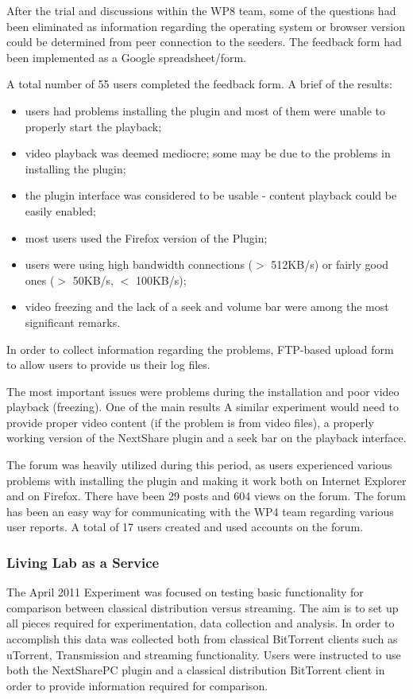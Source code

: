 After the trial and discussions within the WP8 team, some of the questions had
been eliminated as information regarding the operating system or browser
version could be determined from peer connection to the seeders. The feedback
form had been implemented as a Google spreadsheet/form.

A total number of 55 users completed the feedback form. A brief of the
results:
\begin{itemize}
  \item users had problems installing the plugin and most of them were
  unable to properly start the playback;
  \item video playback was deemed mediocre; some may
  be due to the problems in installing the plugin;
  \item the plugin interface was considered to be usable - content playback
  could be easily enabled;
  \item most users used the Firefox version of the Plugin;
  \item users were using high bandwidth connections ($>$ 512KB/s) or fairly
  good ones ($>$ 50KB/s, $<$ 100KB/s);
  \item video freezing and the lack of a seek and volume bar were among the
  most significant remarks.
\end{itemize}

In order to collect information regarding the problems, FTP-based upload form
to allow users to provide us their log files.

The most important issues were problems during the installation and poor video
playback (freezing). One of the main results A similar experiment would need
to provide proper video content (if the problem is from video files), a
properly working version of the NextShare plugin and a seek bar on the
playback interface.

The forum was heavily utilized during this period, as users experienced
various problems with installing the plugin and making it work both on
Internet Explorer and on Firefox. There have been 29 posts and 604 views on
the forum. The forum has been an easy way for communicating with the WP4 team
regarding various user reports. A total of 17 users created and used accounts
on the forum.

\subsubsection{Living Lab as a Service}

The April 2011 Experiment was focused on testing basic functionality for
comparison between classical distribution versus streaming. The aim is to set
up all pieces required for experimentation, data collection and analysis. In
order to accomplish this data was collected both from classical BitTorrent
clients such as uTorrent, Transmission and streaming functionality. Users were
instructed to use both the NextSharePC plugin and a classical distribution
BitTorrent client in order to provide information required for comparison.

